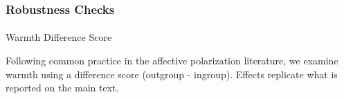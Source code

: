 \documentclass[
  11pt,
  oneside]{article}
\makeatletter
\let\oldparagraph\paragraph
\renewcommand{\paragraph}{
    \@ifstar
      \xxxParagraphStar
      \xxxParagraphNoStar
  }
\newcommand{\xxxParagraphStar}[1]{\oldparagraph*{#1}\mbox{}}
\newcommand{\xxxParagraphNoStar}[1]{\oldparagraph{#1}\mbox{}}
\makeatother
\begin{document}
\subsubsection{Robustness Checks}\label{robustness-checks}

\paragraph{Warmth Difference Score}\label{warmth-difference-score}

Following common practice in the affective polarization literature, we
examine warmth using a difference score (outgroup - ingroup). Effects
replicate what is reported on the main text.

\begin{table}

\caption{\label{tbl-robustness-warmth-diff}Robustness check using warmth
difference scores (outgroup minus ingroup warmth). This
operationalization follows standard practice in affective polarization
research. Upper panel shows simple effects by learner party. Lower panel
shows full mixed-effects regression. Results replicate main findings,
confirming that participants became less affectively polarized toward
the political outgroup.}

\centering{

}
\end{table}
\end{document}
